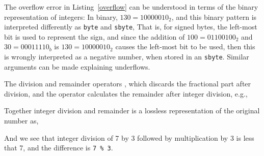 The overflow error in Listing~\ref{overflow} can be understood in terms of the binary representation of integers: In binary, $130=10000010_2$, and this binary pattern is interpreted differently as \lstinline{byte} and \lstinline{sbyte},
%
%
%
That is, for signed bytes, the left-most bit is used to represent the sign, and since the addition of $100=01100100_2$ and $30=00011110_b$ is $130=10000010_2$ causes the left-most bit to be used, then this is wrongly interpreted as a negative number, when stored in an \lstinline{sbyte}. Similar arguments can be made explaining underflows.

The division and remainder operators , which discards the fractional part after division, and the  operator calculates the remainder after integer division, e.g.,
%

%
Together integer division and remainder is a lossless representation of the original number as,
%

%
And we see that integer division of 7 by 3 followed by multiplication by 3 is less that 7, and the difference is \lstinline!7 % 3!.


